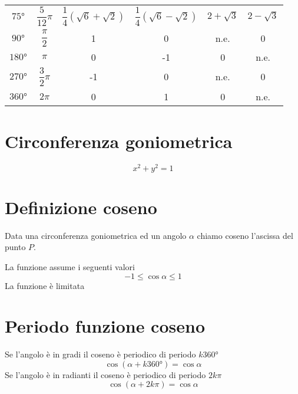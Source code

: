 \begin{center}
\begin{tabular}{cccccc}
		$\ang{75}$ &$\dfrac{5}{12}\pi$ &$\dfrac{1}{4}\left(\sqrt{6}+\sqrt{2}\right)$&$\dfrac{1}{4}\left(\sqrt{6}-\sqrt{2}\right)$&$2+\sqrt{3}$& $2-\sqrt{3}$ \\ [.25cm]
		$\ang{90}$&$\dfrac{\pi}{2}$&1&0&n.e.&0\\[.25cm]
		$\ang{180}$&$\pi$&0&-1& 0 &n.e.\\ [.25cm]
		$\ang{270}$&$\dfrac{3}{2}\pi$&-1&0&n.e.&0\\ [.25cm]
		$\ang{360}$&$2\pi$&0&1&0&n.e.\\ [.25cm]
		\bottomrule%
	\end{tabular}
\end{center}
\section{Circonferenza goniometrica}
\begin{equation}
x^2+y^2=1
\end{equation}
\section{Definizione coseno}
Data una circonferenza goniometrica ed un angolo $\alpha$ chiamo coseno l'ascissa del punto $P$.
\begin{center}
	
\end{center}
La funzione assume i seguenti valori
\begin{equation}
-1\leq \cos\alpha \leq 1
\end{equation}
La funzione è limitata
\section{Periodo funzione coseno}
Se l'angolo è in gradi il coseno è periodico di periodo $k\ang{360}$
\begin{equation}
\cos(\alpha+k\ang{360;;})=\cos\alpha
\end{equation}
Se l'angolo è in radianti il coseno è periodico di periodo $2k\pi$
\begin{equation}
\cos(\alpha+2k\pi)=\cos\alpha
\end{equation}
